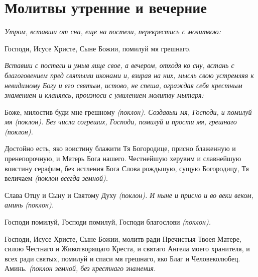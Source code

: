 

\label{_content_edinovercheskie-molitvi}

 


 

\section{Молитвы утренние и вечерние}
 


\itshape Утром, вставши от сна, еще на постели, перекрестись с молитвою:\normalfont{}


Господи, Исусе Христе, Сыне Божии, помилуй мя грешнаго.


\medskip


\itshape Вставши с постели и умыв лице свое, а вечером, отходя ко сну, встань с благоговением пред святыми иконами и, взирая на них, мысль свою устремляя к невидимому Богу и его святым, истово, не спеша, ограждая себя крестным знамением и кланяясь, произноси с умилением молитву мытаря:\normalfont{}


Боже, милостив буди мне грешному \itshape (поклон)\normalfont{}. Создавыи мя, Господи, и помилуй мя \itshape (поклон)\normalfont{}. Без числа согреших, Господи, помилуй и прости мя, грешнаго \itshape (поклон)\normalfont{}.


Достойно есть, яко воистину блажити Тя Богородице, присно блаженную и пренепорочную, и Матерь Бога нашего. Честнейшую херувим и славнейшую воистину серафим, без истления Бога Слова рождьшую, сущую Богородицу, Тя величаем \itshape (поклон всегда земной)\normalfont{}.


Слава Отцу и Сыну и Святому Духу \itshape (поклон)\normalfont{}. И ныне и присно и во веки веком, аминь \itshape (поклон)\normalfont{}.


Господи помилуй, Господи помилуй, Господи благослови \itshape (поклон)\normalfont{}. 


Господи, Исусе Христе, Сыне Божии, молитв ради Пречистыя Твоея Матере, силою Честнаго и Животворящаго Креста, и святаго Ангела моего хранителя, и всех ради святых, помилуй и спаси мя грешнаго, яко Благ и Человеколюбец. Аминь. \itshape (поклон земной, без крестнаго знамения\normalfont{}.


\medskip


